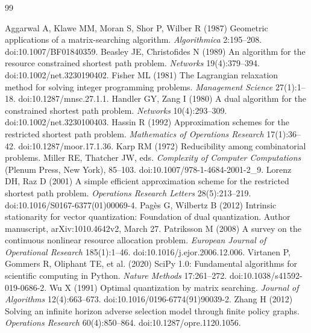 \begin{thebibliography}{99}\raggedright
{}
Aggarwal A, Klawe MM, Moran S, Shor P, Wilber R (1987) Geometric applications of a matrix-searching algorithm. \emph{Algorithmica} 2:195--208. doi:10.1007/BF01840359.
Beasley JE, Christofides N (1989) An algorithm for the resource constrained shortest path problem. \emph{Networks} 19(4):379--394. doi:10.1002/net.3230190402.
Fisher ML (1981) The Lagrangian relaxation method for solving integer programming problems. \emph{Management Science} 27(1):1--18. doi:10.1287/mnsc.27.1.1.
Handler GY, Zang I (1980) A dual algorithm for the constrained shortest path problem. \emph{Networks} 10(4):293--309. doi:10.1002/net.3230100403.
Hassin R (1992) Approximation schemes for the restricted shortest path problem. \emph{Mathematics of Operations Research} 17(1):36--42. doi:10.1287/moor.17.1.36.
Karp RM (1972) Reducibility among combinatorial problems. Miller RE, Thatcher JW, eds. \emph{Complexity of Computer Computations} (Plenum Press, New York), 85--103. doi:10.1007/978-1-4684-2001-2\_9.
Lorenz DH, Raz D (2001) A simple efficient approximation scheme for the restricted shortest path problem. \emph{Operations Research Letters} 28(5):213--219. doi:10.1016/S0167-6377(01)00069-4.
Pag\`es G, Wilbertz B (2012) Intrinsic stationarity for vector quantization: Foundation of dual quantization. Author manuscript, arXiv:1010.4642v2, March 27.
Patriksson M (2008) A survey on the continuous nonlinear resource allocation problem. \emph{European Journal of Operational Research} 185(1):1--46. doi:10.1016/j.ejor.2006.12.006.
Virtanen P, Gommers R, Oliphant TE, et al. (2020) SciPy 1.0: Fundamental algorithms for scientific computing in Python. \emph{Nature Methods} 17:261--272. doi:10.1038/s41592-019-0686-2.
Wu X (1991) Optimal quantization by matrix searching. \emph{Journal of Algorithms} 12(4):663--673. doi:10.1016/0196-6774(91)90039-2.
Zhang H (2012) Solving an infinite horizon adverse selection model through finite policy graphs. \emph{Operations Research} 60(4):850--864. doi:10.1287/opre.1120.1056.
\end{thebibliography}
